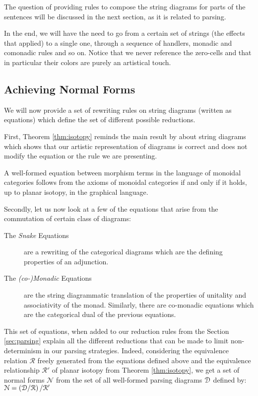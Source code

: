 The question of providing rules to compose the string diagrams for parts of the
sentences will be discussed in the next section, as it is related to parsing.

\smallskip

In the end, we will have the need to go from a certain set of strings (the effects that applied) to a single one, through a sequence of handlers, monadic and comonadic rules and so on.
Notice that we never reference the zero-cells and that in particular their colors are purely an artistical touch.

\subsection{Achieving Normal Forms}
\label{subsec:normalforms}
We will now provide a set of rewriting rules on string diagrams (written as
equations) which define the set of different possible reductions.

First, Theorem \ref{thm:isotopy} reminds the main result by \cite{joyalGeometryTensorCalculus1991} about string diagrams which shows that our artistic representation of diagrams is correct and does not modify the equation or the rule we are presenting.
\begin{theorem}
	\label{thm:isotopy}
	A well-formed equation between morphism terms in the language of monoidal categories follows from the axioms of monoidal categories if and only if it holds, up to planar isotopy, in the graphical language.
\end{theorem}

Secondly, let us now look at a few of the equations that arise from the
commutation of certain class of diagrams:
\begin{description}
	\item[The \emph{Snake} Equations] are a rewriting of the categorical diagrams
	      which are the defining properties of an adjunction.
	\item[The \emph{(co-)Monadic} Equations] are the string diagrammatic
	      translation of the properties of unitality and associativity of the
	      monad.
	      Similarly, there are co-monadic equations which are the categorical dual
	      of the previous equations.
\end{description}
This set of equations, when added to our reduction rules from the Section
\ref{sec:parsing} explain all the different reductions that can be made to
limit non-determinism in our parsing strategies.
Indeed, considering the equivalence relation $\mathcal{R}$ freely generated
from the equations defined above and the equivalence relationship
$\mathcal{R}'$ of planar isotopy from Theorem \ref{thm:isotopy}, we get a set
of normal forms $\mathcal{N}$ from the set of all well-formed parsing diagrams
$\mathcal{D}$ defined by:
$\mathcal{N} = \left( \mathcal{D} / \mathcal{R} \right) / \mathcal{R}'$


